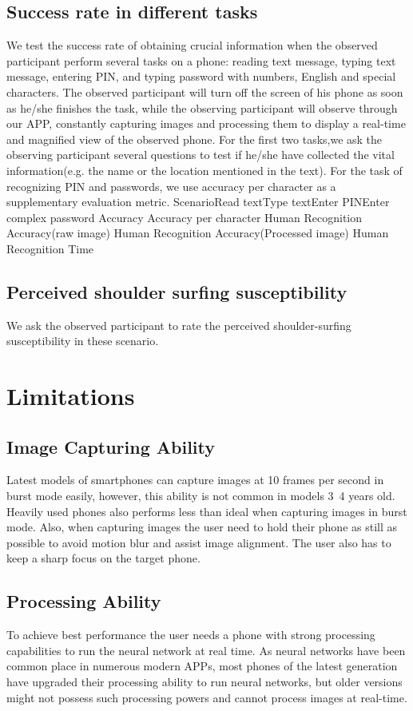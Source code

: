 \subsection{Success rate in different tasks}
We test the success rate of obtaining crucial information when the observed participant perform several tasks on a phone: reading text message, typing text message, entering PIN, and typing password with numbers, English and special characters. The observed participant will turn off the screen of his phone as soon as he/she finishes the task, while the observing participant will observe through our APP, constantly capturing images and processing them to display a real-time and magnified view of the observed phone. For the first two tasks,we ask the observing participant several questions to test if he/she have collected the vital information(e.g. the name or the location mentioned in the text). For the task of recognizing PIN and passwords, we use accuracy per character as a supplementary evaluation metric.
ScenarioRead textType textEnter PINEnter complex password
Accuracy
Accuracy per character
Human Recognition Accuracy(raw image)
Human Recognition Accuracy(Processed image)
Human Recognition Time
\subsection{Perceived shoulder surfing susceptibility}
We ask the observed participant to rate the perceived shoulder-surfing susceptibility in these scenario.
\section{Limitations}
\subsection{Image Capturing Ability}
Latest models of smartphones can capture images at 10 frames per second in burst mode easily, however, this ability is not common in models 3~4 years old. Heavily used phones also performs less than ideal when capturing images in burst mode. Also, when capturing images the user need to hold their phone as still as possible to avoid motion blur and assist image alignment. The user also has to keep a sharp focus on the target phone.
\subsection{Processing Ability}
To achieve best performance the user needs a phone with strong processing capabilities to run the neural network at real time. As neural networks have been common place in numerous modern APPs, most phones of the latest generation have upgraded their processing ability to run neural networks, but older versions might not possess such processing powers and cannot process images at real-time.
